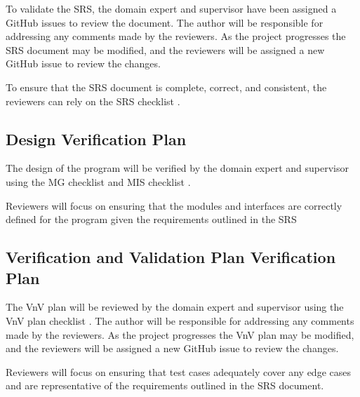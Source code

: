 \documentclass[12pt, titlepage]{article}
\begin{document}
To validate the SRS, the domain expert and supervisor have been assigned a
GitHub issues to review the document. The author will be responsible for
addressing any comments made by the reviewers. As the project progresses
the SRS document may be modified, and the reviewers will be assigned a new
GitHub issue to review the changes.

To ensure that the SRS document is complete, correct, and consistent, the
reviewers can rely on the SRS checklist \cite{SRSChecklist}.

\subsection{Design Verification Plan}

The design of the \progname{} program will be verified by the domain expert and
supervisor using the MG checklist \cite{MGChecklist} and MIS checklist \cite{MISChecklist}.

Reviewers will focus on ensuring that the modules and interfaces are correctly
defined for the \progname{} program given the requirements outlined in the SRS





\subsection{Verification and Validation Plan Verification Plan}

The VnV plan will be reviewed by the domain expert and supervisor using the 
VnV plan checklist \cite{VnVChecklist}. The author will be responsible for
addressing any comments made by the reviewers. As the project progresses the
VnV plan may be modified, and the reviewers will be assigned a new GitHub issue
to review the changes.

Reviewers will focus on ensuring that test cases adequately cover any edge cases
and are representative of the requirements outlined in the SRS document.



\end{document}
